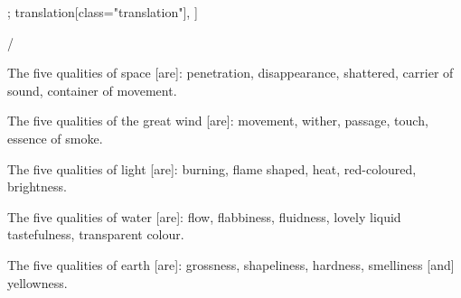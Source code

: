 \begin{alignment}[
  texts=edition[class="edition"];
  translation[class="translation"],
  ]
\begin{edition}
\begin{prose}
/
\dd{}
\dd{}
\dd{}
\dd{}
\end{prose}
  \end{edition}
  \begin{translation}
    \begin{tlate}     
The five qualities of space [are]: penetration, disappearance, shattered, carrier of sound, container of movement. 

      The five qualities of the great wind [are]: movement, wither, passage, touch, essence of smoke.

      The five qualities of light [are]: burning, flame shaped, heat, red-coloured, brightness.

      The five qualities of water [are]: flow, flabbiness, fluidness, lovely liquid tastefulness, transparent colour.

      The five qualities of earth [are]: grossness, shapeliness, hardness, smelliness [and] yellowness.
     \end{tlate}
  \end{translation}
\end{alignment}
\pagebreak %
